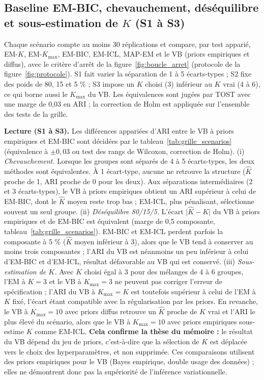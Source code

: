 \subsection{Baseline EM-BIC, chevauchement, déséquilibre et sous-estimation de $K$ (S1 à S3)}
Chaque scénario compte au moins 30 réplications et compare, par test apparié, EM-$K$, EM-$K_{\max}$, EM-BIC, EM-ICL, MAP-EM et le VB (priors empiriques et diffus), avec le critère d'arrêt de la figure~\ref{fig:boucle_arret} (protocole de la figure~\ref{fig:protocole}). S1 fait varier la séparation de 1 à 5 écarts-types ; S2 fixe des poids de 80, 15 et 5 \% ; S3 impose un $K$ choisi (3) inférieur au $K$ vrai (4 à 6), ce qui borne aussi le $K_{\max}$ du VB. Les équivalences sont jugées par TOST avec une marge de 0,03 en ARI ; la correction de Holm est appliquée sur l'ensemble des tests de la grille.





\textbf{Lecture (S1 à S3). }Les différences appariées d'ARI entre le VB à priors empiriques et EM-BIC sont décidées par le tableau~\ref{tab:grille_scenarios} (équivalence à $\pm0{,}03$ ou test des rangs de Wilcoxon, correction de Holm). (i) \emph{Chevauchement.} Lorsque les groupes sont séparés de 4 à 5 écarts-types, les deux méthodes sont équivalentes. À 1 écart-type, aucune ne retrouve la structure ($\hat K$ proche de 1, ARI proche de 0 pour les deux). Aux séparations intermédiaires (2 et 3 écarts-types), le VB à priors empiriques obtient un ARI supérieur à celui de EM-BIC, dont le $\hat K$ moyen reste trop bas ; EM-ICL, plus pénalisant, sélectionne souvent un seul groupe. (ii) \emph{Déséquilibre 80/15/5.} L'écart $\lvert\hat K - K\rvert$ du VB à priors empiriques et de EM-BIC est équivalent (marge de 0,5 composante, tableau~\ref{tab:grille_scenarios}). EM-BIC et EM-ICL perdent parfois la composante à 5 \% ($\hat K$ moyen inférieur à 3), alors que le VB tend à conserver au moins trois composantes ; l'ARI du VB est néanmoins un peu inférieur à celui d'EM-BIC et d'EM-ICL, résultat défavorable au VB qui est conservé. (iii) \emph{Sous-estimation de $K$.} Avec $K$ choisi égal à 3 pour des mélanges de 4 à 6 groupes, l'EM à $K=3$ et le VB à $K_{\max}=3$ ne peuvent pas corriger l'erreur de spécification ; l'ARI du VB à $K_{\max}=K$ est toutefois supérieur à celui de l'EM à $K$ fixé, l'écart étant compatible avec la régularisation par les priors. En revanche, le VB à $K_{\max}=10$ avec priors diffus retrouve un $\hat K$ proche de $K$ vrai et l'ARI le plus élevé du scénario, alors que le VB à $K_{\max}=10$ avec priors empiriques sous-estime $K$ comme EM-ICL. \textbf{Cela confirme la thèse du mémoire :} le résultat du VB dépend du jeu de priors, c'est-à-dire que la sélection de $K$ est déplacée vers le choix des hyperparamètres, et non supprimée. Ces comparaisons utilisent des priors empiriques pour le VB (Bayes empirique, double usage des données) ; elles ne démontrent donc pas la supériorité de l'inférence variationnelle.

